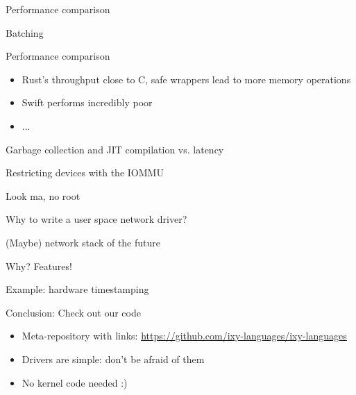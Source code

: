 \documentclass[NET,english,aspectratio=169,notitleframe,draft]{tumbeamer}
\begin{document}
\begin{frame}{Performance comparison}
\centering
\end{frame}

\begin{frame}{Batching}
\centering
\end{frame}

\begin{frame}{Performance comparison}
\begin{itemize}
\item Rust's throughput close to C, safe wrappers lead to more memory operations
\item Swift performs incredibly poor
\item ...
\end{itemize}
\end{frame}

\begin{frame}{Garbage collection and JIT compilation vs. latency}
\end{frame}


\begin{frame}{Restricting devices with the IOMMU}
\end{frame}

\begin{frame}{Look ma, no root}
\end{frame}


\begin{frame}{Why to write a user space network driver?}
\end{frame}

\begin{frame}{(Maybe) network stack of the future}
\end{frame}

\begin{frame}{Why? Features!}
\end{frame}

\begin{frame}{Example: hardware timestamping}
\end{frame}


\begin{frame}{Conclusion: Check out our code}
\begin{itemize}
\item Meta-repository with links: \url{https://github.com/ixy-languages/ixy-languages}
\item Drivers are simple: don't be afraid of them
\item No kernel code needed :)
\end{itemize}
\end{frame}
\end{document}
